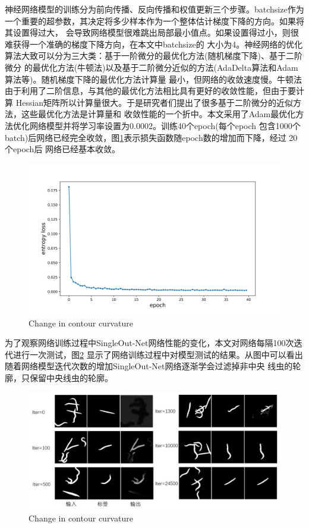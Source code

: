 	神经网络模型的训练分为前向传播、反向传播和权值更新三个步骤。batchsize作为一个重要的超参数，其决定将多少样本作为一个整体估计梯度下降的方向。如果将其设置得过大，
	会导致网络模型很难跳出局部最小值点。如果设置得过小，则很难获得一个准确的梯度下降方向，在本文中batchsize的
	大小为4。神经网络的优化算法大致可以分为三大类：基于一阶微分的最优化方法(随机梯度下降)、基于二阶微分
	的最优化方法(牛顿法)以及基于二阶微分近似的方法(AdaDelta算法\cite{zeiler2012adadelta}和Adam算法\cite{kinga2015method}等)。随机梯度下降的最优化方法计算量
	最小，但网络的收敛速度慢。牛顿法由于利用了二阶信息，与其他的最优化方法相比具有更好的收敛性能，但由于要计算
	Hessian矩阵所以计算量很大。于是研究者们提出了很多基于二阶微分的近似方法，这些最优化方法是计算量和
	收敛性能的一个折中。本文采用了Adam最优化方法优化网络模型并将学习率设置为0.0002。训练40个epoch(每个epoch
	包含1000个batch)后网络已经完全收敛，图\ref{fig:chap4:loss}表示损失函数随epoch数的增加而下降，经过 20个epoch后
	网络已经基本收敛。
	\begin{figure}[thb]
	  \centering
	  \includegraphics[width=13cm]{figure/chap4/loss.jpg}
		{Change in contour curvature}
	  \label{fig:chap4:loss}
	\end{figure}
	
	为了观察网络训练过程中SingleOut-Net网络性能的变化，本文对网络每隔100次迭代进行一次测试，图\ref{fig:chap4:progress}
	显示了网络训练过程中对模型测试的结果。从图中可以看出随着网络模型迭代次数的增加SingleOut-Net网络逐渐学会过滤掉非中央
	线虫的轮廓，只保留中央线虫的轮廓。
		\begin{figure}[htb]
	  \centering
	  \includegraphics[width=15cm]{figure/chap4/progress.jpg}
		{Change in contour curvature}
	  \label{fig:chap4:progress}
	\end{figure}
